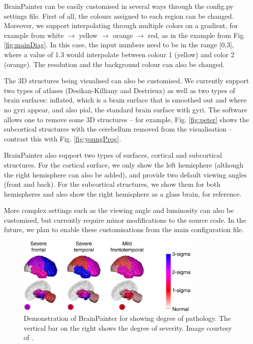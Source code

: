 \documentclass{llncs}
\begin{document}

BrainPainter can be easily customised in several ways through the config.py settings file. First of all, the colours assigned to each region can be changed. Moreover, we support interpolating through multiple colors on a gradient, for example from white $\rightarrow$ yellow $\rightarrow$ orange $\rightarrow$ red, as in the example from Fig. \ref{fig:mainDiag}. In this case, the input numbers need to be in the range [0,3], where a value of 1.3 would interpolate between colour 1 (yellow) and color 2 (orange). The resolution and the background colour can also be changed.  

The 3D structures being visualised can also be customised. We currently support two types of atlases (Desikan-Killiany and Destrieux) as well as two types of brain surfaces: inflated, which is a brain surface that is smoothed out and where no gyri appear, and also pial, the standard brain surface with gyri. The software allows one to remove some 3D structures -- for example, Fig. \ref{fig:peter} shows the subcortical structures with the cerebellum removed from the visualisation -- contrast this with Fig. \ref{fig:youngProg}. 
 

BrainPainter also support two types of surfaces, cortical and subcortical structures. For the cortical surface, we only show the left hemisphere (although the right hemisphere can also be added), and provide two default viewing angles (front and back). For the subcortical structures, we show them for both hemispheres and also show the right hemisphere as a glass brain, for reference.

More complex settings such as the viewing angle and luminosity can also be customised, but currently require minor modifications to the source code. In the future, we plan to enable these customisations from the main configuration file.
 

\begin{figure}
\centering
 \includegraphics[width=0.8\textwidth]{images/young_3brains.png}
 \caption{Demonstration of BrainPainter for showing degree of pathology. The vertical bar on the right shows the degree of severity. Image courtesy of \cite{young2018uncovering}.}
 \label{fig:youngDegree}
\end{figure}
\end{document}
